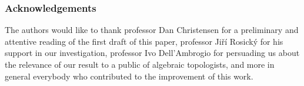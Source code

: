 \subsubsection*{Acknowledgements}
The authors would like to thank professor Dan Christensen for a preliminary and attentive reading of the first draft of this paper, professor Jiří Rosický for  his support in our investigation, professor Ivo Dell'Ambrogio for persuading us about the relevance of our result to a public of algebraic topologists, and more in general everybody who contributed to the improvement of this work.
